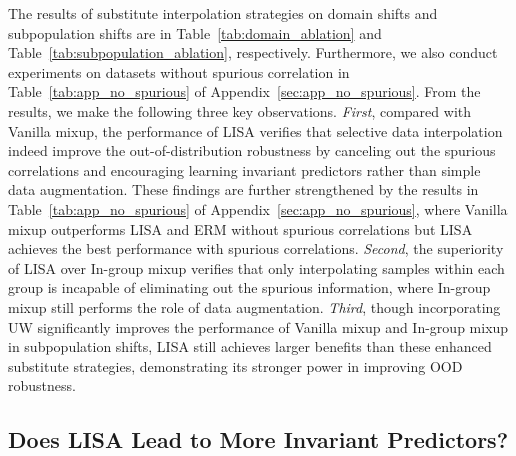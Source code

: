 The results of substitute interpolation strategies on domain shifts and subpopulation shifts are in Table~\ref{tab:domain_ablation} and Table~\ref{tab:subpopulation_ablation}, respectively. Furthermore, we also conduct experiments on datasets without spurious correlation in Table~\ref{tab:app_no_spurious} of Appendix~\ref{sec:app_no_spurious}. From the results, we make the following three key observations. \emph{First}, compared with Vanilla mixup, the performance of LISA verifies that selective data interpolation indeed improve the out-of-distribution robustness by canceling out the spurious correlations and encouraging learning invariant predictors rather than simple data augmentation. These findings are further strengthened by the results in Table~\ref{tab:app_no_spurious} of Appendix~\ref{sec:app_no_spurious}, where Vanilla mixup outperforms LISA and ERM without spurious correlations but LISA achieves the best performance with spurious correlations. \emph{Second}, the superiority of LISA over In-group mixup verifies that only interpolating samples within each group is incapable of eliminating out the spurious information, where In-group mixup still performs the role of data augmentation. \emph{Third}, though incorporating UW significantly improves the performance of Vanilla mixup and In-group mixup in subpopulation shifts, LISA still achieves larger benefits than these enhanced substitute strategies, demonstrating its stronger power in improving OOD robustness.

\subsection{Does LISA Lead to More Invariant Predictors?}
\label{sec:invariance}

